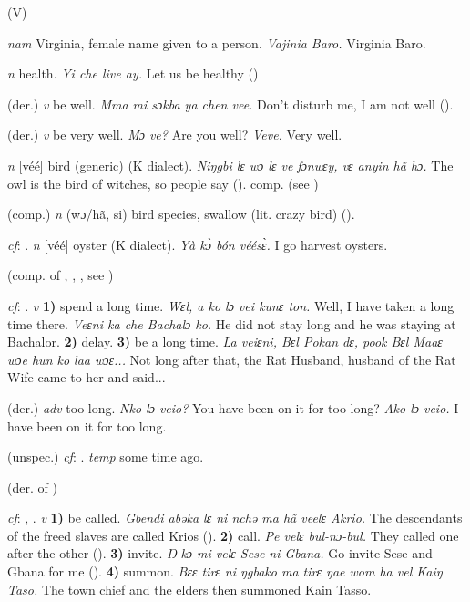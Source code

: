 \begin{letter}{(V)}

 \textit{nam} Virginia, female name given to a person. \textit{Vajinia Baro.} Virginia Baro.

 \textit{n} health. \textit{Yi che live ay.} Let us be healthy (\citealt{Pichl1967})

 (der.) \textit{v} be well. \textit{Mma mi sɔkba ya chen vee.} Don't disturb me, I am not well (\citealt{Pichl1967}). 

 (der.) \textit{v} be very well. \textit{Mɔ ve?} Are you well? \textit{Veve.} Very well.

 \textit{n} [véé] bird (generic) (K dialect). \textit{Niŋgbi lɛ wɔ lɛ ve fɔnwɛy, vɛ anyin hã hɔ.} The owl is the bird of witches, so people say (\citealt{Pichl1967}). comp.  (see ) 

 (comp.) \textit{n} (wɔ/hã, si) bird species, swallow (lit. crazy bird) (\citealt{Pichl1967}). 

 \textit{cf}: . \textit{n} [véé] oyster (K dialect). \textit{Yà kɔ̀ bón véésɛ̀.} I go harvest oysters.

 (comp. of , , , see ) 

 \textit{cf}: . \textit{v} \textbf{1)} spend a long time. \textit{Wɛl, a ko lɔ vei kunɛ ton.} Well, I have taken a long time there. \textit{Veɛni ka che Bachalɔ ko.} He did not stay long and he was staying at Bachalor. \textbf{2)} delay. \textbf{3)} be a long time. \textit{La veiɛni, Bɛl Pokan dɛ, pook Bɛl Maaɛ wɔe hun ko laa wɔɛ...} Not long after that, the Rat Husband, husband of the Rat Wife came to her and said...

 (der.) \textit{adv} too long. \textit{Nko lɔ veio?} You have been on it for too long? \textit{Ako lɔ veio.} I have been on it for too long.

 (unspec.) \textit{cf}: . \textit{temp} some time ago.

 (der. of ) 

 \textit{cf}: , . \textit{v} \textbf{1)} be called. \textit{Gbendi abəka lɛ ni nchə ma hã veelɛ Akrio.} The descendants of the freed slaves are called Krios (\citealt{Pichl1967}). \textbf{2)} call. \textit{Pe velɛ bul-nɔ-bul.} They called one after the other (\citealt{Pichl1967}). \textbf{3)} invite. \textit{Ŋ kɔ mi velɛ Sese ni Gbana.} Go invite Sese and Gbana for me (\citealt{Pichl1967}). \textbf{4)} summon. \textit{Bɛɛ tirɛ ni ŋgbako ma tirɛ ŋae wom ha vel Kaiŋ Taso.} The town chief and the elders then summoned Kain Tasso.


\end{letter}
